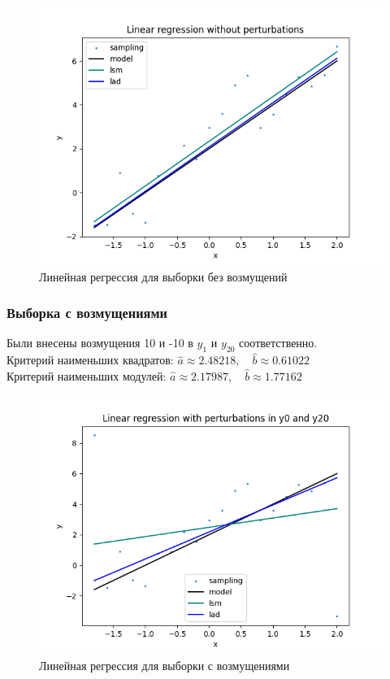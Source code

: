 \begin{figure}[H]
	\begin{center}
		\includegraphics[scale=0.7]{regression_without_pert.png}
	\end{center}
	\caption{Линейная регрессия для выборки без возмущений}
\end{figure}

\subsubsection{Выборка с возмущениями}

Были внесены возмущения 10 и -10 в $y_1$ и $y_{20}$ соответственно. \\

Критерий наименьших квадратов: $\hat{a} \approx 2.48218, \quad \hat{b} \approx 0.61022$ \\

Критерий наименьших модулей: $\hat{a} \approx 2.17987, \quad \hat{b} \approx 1.77162$

\begin{figure}[H]
	\begin{center}
		\includegraphics[scale=0.7]{regression_with_pert.png}
	\end{center}
	\caption{Линейная регрессия для выборки с возмущениями}
\end{figure}
